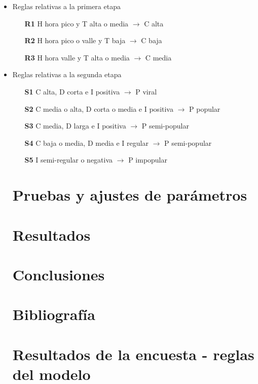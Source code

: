 \documentclass{article}
\begin{document}
\begin{itemize}
	\item Reglas relativas a la primera etapa
	\begin{itemize}
		\item [\textbf{R1}] H hora pico y T alta o media $\rightarrow$ C alta 
		\item [\textbf{R2}] H hora pico o valle y T baja $\rightarrow$ C baja 
		\item [\textbf{R3}] H hora valle y T alta o media $\rightarrow$ C media 
	\end{itemize}
	\item Reglas relativas a la segunda etapa
	\begin{itemize}
		\item [\textbf{S1}] C alta, D corta e I positiva $\rightarrow$ P viral
		\item [\textbf{S2}] C media o alta, D corta o media e I positiva $\rightarrow$ P popular
		\item [\textbf{S3}] C media, D larga e I positiva $\rightarrow$ P semi-popular
		\item [\textbf{S4}] C baja o media, D media e I regular $\rightarrow$ P semi-popular
		\item [\textbf{S5}] I semi-regular o negativa $\rightarrow$ P impopular

\end{itemize}

\section{Pruebas y ajustes de parámetros}


\section{Resultados}

\section{Conclusiones}

\section{Bibliografía}

\pagebreak
\section*{Resultados de la encuesta - reglas del modelo}


\end{itemize}
\end{document}
